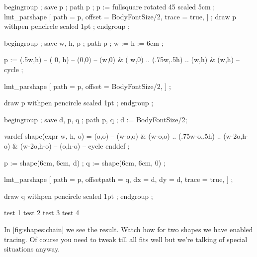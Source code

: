   begingroup ;
    save p ; path p ; p := fullsquare rotated 45 scaled 5cm ;
    lmt_parshape [
        path   = p,
        offset = BodyFontSize/2,
        trace  = true,
    ] ;
    draw p withpen pencircle scaled 1pt ;
  endgroup ;
\stopuseMPgraphic

  begingroup ;
    save w, h, p ; path p ; w := h := 6cm ;

    p := (.5w,h) -- (   0,  h) -- (0,0) -- (w,0) &
         (  w,0) .. (.75w,.5h) .. (w,h) &  (w,h) -- cycle ;

    lmt_parshape [
        path   = p,
        offset = BodyFontSize/2,
    ] ;

    draw p withpen pencircle scaled 1pt ;
  endgroup ;
\stopuseMPgraphic

  begingroup ;
    save d, p, q ; path p, q ; d := BodyFontSize/2;

    vardef shape(expr w, h, o) =
        (o,o) -- (w-o,o) & (w-o,o) .. (.75w-o,.5h) ..
        (w-2o,h-o) & (w-2o,h-o) -- (o,h-o) -- cycle
    enddef ;

    p := shape(6cm, 6cm, d) ; q := shape(6cm, 6cm, 0) ;

    lmt_parshape [
        path       = p,
        offsetpath = q,
        dx         = d,
        dy         = d,
        trace      = true,
    ] ;

    draw q withpen pencircle scaled 1pt ;
  endgroup ;
\stopuseMPgraphic


\startbuffer
  \stopshapetext
  \startcombination[2*2]
    {\framed[offset=overlay,frame=off,background=test 1]{\getshapetext}}
        {test 1}
    {\framed[offset=overlay,frame=off,background=test 2]{\getshapetext}}
        {test 2}
    {\framed[offset=overlay,frame=off,background=test 3]{\getshapetext}}
        {test 3}
    {\framed[offset=overlay,frame=off,background=test 4]{\getshapetext}}
        {test 4}
  \stopcombination
\stopbuffer

\typebuffer[option=TEX]

In  [fig:shapes:chain] we see the result. Watch how for two shapes
we have enabled tracing. Of course you need to tweak till all fits well but we're
talking of special situations anyway.


